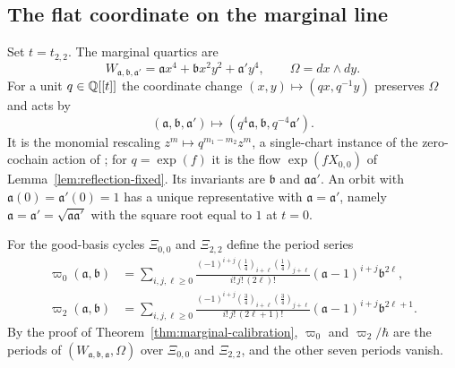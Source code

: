 \subsection{The flat coordinate on the marginal line}
\label{subsec:marginal-calibration}

Set $t=t_{2,2}$.  The marginal quartics are
\begin{equation}\label{eq:ABC-family}
 W_{\mathfrak a,\mathfrak b,\mathfrak a'}=\mathfrak a x^4+\mathfrak b x^2y^2+\mathfrak a'y^4,
 \qquad \Omega=dx\wedge dy.
\end{equation}
For a unit $q\in\mathbb Q[[t]]$ the coordinate change $(x,y)\mapsto(qx,q^{-1}y)$
preserves $\Omega$ and acts by
\begin{equation}\label{eq:zero-cochain}
 (\mathfrak a,\mathfrak b,\mathfrak a')\longmapsto(q^4\mathfrak a,\mathfrak b,q^{-4}\mathfrak a').
\end{equation}
It is the monomial rescaling $z^m\mapsto q^{m_1-m_2}z^m$, a single-chart
instance of the zero-cochain action of
\cite[Prop.~5.2]{grossetal2016theta}; for $q=\exp(f)$ it is the flow
$\exp(fX_{0,0})$ of Lemma~\ref{lem:reflection-fixed}.  Its invariants are
$\mathfrak b$ and $\mathfrak a\mathfrak a'$.  An orbit with $\mathfrak a(0)=\mathfrak a'(0)=1$ has a
unique representative with $\mathfrak a=\mathfrak a'$, namely
$\mathfrak a=\mathfrak a'=\sqrt{\mathfrak a\mathfrak a'}$ with the square root equal to $1$
at $t=0$.

For the good-basis cycles $\Xi_{0,0}$ and $\Xi_{2,2}$ define the period
series
\begin{align}
 \varpi_0(\mathfrak a,\mathfrak b)
 &=\sum_{i,j,\ell\geq0}
 \frac{(-1)^{i+j}(\frac14)_{i+\ell}(\frac14)_{j+\ell}}
      {i!\,j!\,(2\ell)!}
 (\mathfrak a-1)^{i+j}\mathfrak b^{2\ell},\label{eq:F0}\\
 \varpi_2(\mathfrak a,\mathfrak b)
 &=\sum_{i,j,\ell\geq0}
 \frac{(-1)^{i+j}(\frac34)_{i+\ell}(\frac34)_{j+\ell}}
      {i!\,j!\,(2\ell+1)!}
 (\mathfrak a-1)^{i+j}\mathfrak b^{2\ell+1}.\label{eq:F2}
\end{align}
By the proof of Theorem~\ref{thm:marginal-calibration}, $\varpi_0$ and
$\varpi_2/\hbar$ are the periods of
$(W_{\mathfrak a,\mathfrak b,\mathfrak a},\Omega)$ over $\Xi_{0,0}$ and
$\Xi_{2,2}$, and the other seven periods vanish.

